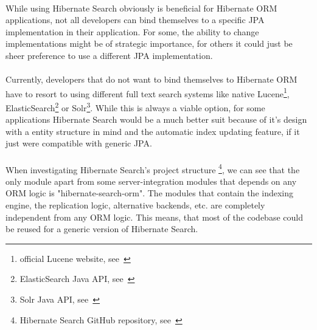 \\
While using Hibernate Search obviously is beneficial for Hibernate ORM applications, not all developers can bind themselves to a specific JPA implementation in their application. For some, the ability to change implementations might be of strategic importance, for others it could just be sheer preference to use a different JPA implementation.
\\\\
Currently, developers that do not want to bind themselves to Hibernate ORM have to resort to using different full text search systems like native Lucene\footnote{official Lucene website, see~\cite{lucene_apache_org}}, ElasticSearch\footnote{ElasticSearch Java API, see~\cite{elasticsearch_java_api}} or Solr\footnote{Solr Java API, see~\cite{solr_java_api}}. While this is always a viable option, for some applications Hibernate Search would be a much better suit because of it's design with a entity structure in mind and the automatic index updating feature, if it just were compatible with generic JPA.
\\\\
When investigating Hibernate Search's project structure
\footnote{Hibernate Search GitHub repository, see~\cite{hsearch_source_code_git}}, we can see that the only module apart from some server-integration modules that depends on any ORM logic is "hibernate-search-orm". The modules that contain the indexing engine, the replication logic, alternative backends, etc. are completely independent from any ORM logic. This means, that most of the codebase could be reused for a generic version of Hibernate Search.

